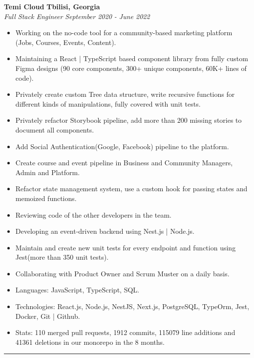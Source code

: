 \documentclass[10pt,letterpaper]{article}
\begin{document}
\begin{itemize}
\begin{itemize}[label=\textbullet]
  \end{itemize}


   {\textbf{Temi Cloud} \hfill
      \textbf{Tbilisi, Georgia}}
    \\
    {\emph{Full Stack Engineer} \hfill \emph{September 2020 - June 2022}}

    \begin{itemize}[label=\textbullet]
    \itemsep0.5em
    \item Working on the no-code tool for a community-based marketing platform (Jobs, Courses, Events, Content).
    \item Maintaining a React | TypeScript based component library from fully custom Figma designs (90 core components, 300+ unique components, 60K+ lines of code).
    \item Privately create custom Tree data structure, write recursive functions for different kinds of manipulations, fully covered with unit tests.
    \item Privately refactor Storybook pipeline, add more than 200 missing stories to document all components.
    \item Add Social Authentication(Google, Facebook) pipeline to the platform.
    \item Create course and event pipeline in Business and Community Managers, Admin and Platform.
    \item Refactor state management system, use a custom hook for passing states and memoized functions.
    \item Reviewing code of the other developers in the team.
    \item Developing an event-driven backend using Nest.js | Node.js.
    \item Maintain and create new unit tests for every endpoint and function using Jest(more than 350 unit tests).
    \item Collaborating with Product Owner and Scrum Muster on a daily basis.
    \item Languages: JavaScript, TypeScript, SQL.
    \item Technologies: React.js, Node.js, NestJS, Next.js, PostgreSQL, TypeOrm, Jest, Docker, Git | Github.
    \item Stats: 110 merged pull requests, 1912 commits, 115079 line additions and 41361 deletions in our monorepo in the 8 months.
    \end{itemize}
\end{itemize}

\hrule
\vspace{-1.0em}
\end{document}
